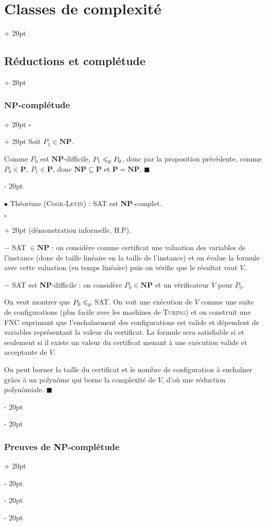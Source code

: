 \documentclass[a4paper, 12pt, twoside]{article}
\renewcommand{\le}{\leqslant}
\newcommand{\ind}[1][20pt]{\advance\leftskip + #1}
\newcommand{\deind}[1][20pt]{\advance\leftskip - #1}
\newenvironment{indt}[2][20pt]{#2 \par \ind[#1]}{\par \deind} %
\newenvironment{proof}[1][{}]{\begin{indt}{$\square$ #1}}{$\blacksquare$ \end{indt}}
\begin{document}
\begin{indt}{\section{Classes de complexité}}
\begin{indt}{\subsection{Réductions et complétude}}
\begin{indt}{\subsubsection{$\mathbf{NP}$-complétude}}
\begin{proof}
                    Soit $P_1 \in \mathbf{NP}$.

                    Comme $P_0$ est $\mathbf{NP}$-difficile, $P_1 \le_{\rm p} P_0$, donc par la proposition précédente, comme $P_0 \in \mathbf P,\ P_1 \in \mathbf P$, donc $\mathbf{NP} \subseteq \mathbf P$ et $\mathbf P = \mathbf{NP}$.
                \end{proof}

                \vspace{12pt}
                
                $\bullet$ Théorème (\textsc{Cook-Levin}) : SAT est \textbf{NP}-complet.

                \vspace{6pt}
                
                \begin{proof}
                    (démonstration informelle, H.P).

                    $-$ SAT $\in \mathbf{NP}$ : on considère comme certificat une valuation des variables de l'instance (donc de taille linéaire en la taille de l'instance) et on évalue la formule avec cette valuation (en temps linéaire) puis on vérifie que le résultat vaut $V$.

                    \vspace{6pt}
                    
                    $-$ SAT est \textbf{NP}-difficile : on considère $P_0 \in \mathbf{NP}$ et un vérificateur $V$ pour $P_0$.

                    On veut montrer que $P_0 \le_{\rm p}$ SAT. On voit une exécution de $V$ comme une suite de configurations (plus facile avec les machines de \textsc{Turing}) et on construit une FNC exprimant que l'enchaînement des configurations est valide et dépendent de variables représentant la valeur du certificat. La formule sera satisfiable si et seulement si il existe un valeur du certificat menant à une exécution valide et acceptante de $V$.

                    On peut borner la taille du certificat et le nombre de configuration à enchaîner grâce à un polynôme qui borne la complexité de $V$, d'où une réduction polynômiale.
                \end{proof}
            \end{indt}

            \vspace{12pt}
            
            \begin{indt}{\subsubsection{Preuves de \textbf{NP}-complétude}}
                \label{2.3.3}


\end{indt}
\end{indt}
\end{indt}
\end{document}
